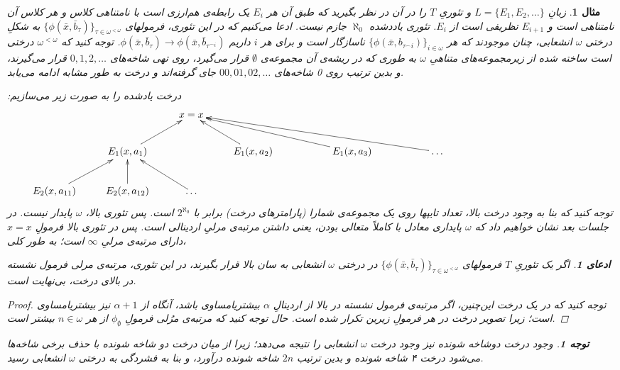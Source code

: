 \documentclass[12pt,a4paper]{report}
\theoremstyle{colorhead}
\newtheorem{mesal}[thm]{مثال}
\newtheorem{tav}[thm]{توجه}
\newtheorem{claim}[thm]{ادعای}
\begin{document}
\begin{mesal}
زبانِ
$L=\{E_1,E_2,\ldots\}$
و تئوریِ
$T$
را در آن در نظر بگیرید که طبق آن هر
$E_i$
یک رابطه‌ی هم‌ارزی است با نامتناهی کلاس و هر کلاس آن نامتناهی است و 
$E_{i+1}$
تظریفی است از
$E_i$.
تئوری یاددشده 
$\aleph_0$
جازم نیست. ادعا می‌کنیم که 
در این تئوری،
فرمولهای
$\{\phi(\bar{x},\bar{b}_\tau)\}_{\tau\in \omega^{<\omega}}$
به شکلِ درختی
$\omega$
انشعابی،
چنان موجودند که هر
$\{\phi(\bar{x},b_{\tau^\frown i})\}_{i\in \omega}$
ناسازگار است و 
برای هر
$i$
داریم
$\phi(\bar{x},\bar{b}_\tau)\to \phi(\bar{x},\bar{b}_{\tau^{\frown i}})$.
توجه کنید که
$\omega^{<\omega}$
درختی است ساخته شده از زیرمجموعه‌های متناهیِ
$\omega$
به طوری که در  ریشه‌ی آن مجموعه‌ی
$\emptyset$ 
قرار می‌گیرد، روی تهی شاخه‌های
$0,1,2,\ldots$
قرار می‌گیرند، و بدین ترتیب روی 0 شاخه‌های
$00,01,02,\ldots$
جای گرفته‌اند و درخت به طور مشابه ادامه می‌یابد.
\par 
درخت یادشده را به صورت زیر می‌سازیم:
\[
\xymatrix{
 & & x=x&  & & &  &  &  & &  & &
\\
 & E_1(x,a_1) \ar[ur]&  & E_1(x,a_2)\ar[ul]&  & E_1(x,a_3)\ar[ulll]& & \ar[ulllll] \ldots &  & & & &
\\
E_2(x,a_{11})\ar[ur] & E_2(x,a_{12})\ar[u]& \ldots \ar[ul]& & & & & & 
& & &  &
}
\]
توجه کنید که بنا به وجود درخت بالا، تعداد تایپها روی یک مجموعه‌ی شمارا (پارامترهای درخت) 
برابر با
$2^{\aleph_0}$
است. پس تئوری بالا،
$\omega$
پایدار نیست. در جلسات بعد نشان خواهیم داد که
$\omega$
پایداری معادل با کاملاً متعالی بودن، یعنی داشتن مرتبه‌ی مرلیِ اردینالی است.
پس در تئوری بالا فرمولِ
$x=x$
دارای مرتبه‌ی مرلیِ
$\infty$
است؛ به طور کلی، 
\begin{claim}
اگر یک تئوریِ
$T$
فرمولهای
$\{\phi(\bar{x},\bar{b}_\tau)\}_{\tau\in \omega^{<\omega}}$
در درختی
$\omega$
انشعابی
به سان بالا قرار بگیرند، در این تئوری، مرتبه‌ی مرلی فرمول نشسته در بالای درخت، بی‌نهایت است.
\end{claim}
\begin{proof}
توجه کنید که در یک درخت این‌چنین، اگر مرتبه‌ی فرمول نشسته در بالا از اردینالِ
$\alpha$
بیشتریامساوی باشد، آنگاه از
$\alpha+1$
نیز بیشتریامساوی است؛ زیرا تصویر درخت در هر فرمولِ زیرین تکرار شده است. حال توجه کنید که
مرتبه‌ی مرُلی فرمولِ
$\phi_\emptyset$
از هر 
$n\in \omega$
بیشتر است. 
\end{proof}
\begin{tav}
وجود درخت دوشاخه شونده نیز وجود درخت
$\omega$
انشعابی را نتیجه می‌دهد؛ زیرا از میان درخت دو شاخه شونده با حذف برخی شاخه‌ها می‌شود
درخت ۴ شاخه شونده و بدین ترتیب 
$2n$
شاخه شونده درآورد، و بنا به فشردگی به درختی 
$\omega$
انشعابی رسید.
\end{tav}
\end{mesal}
\end{document}

